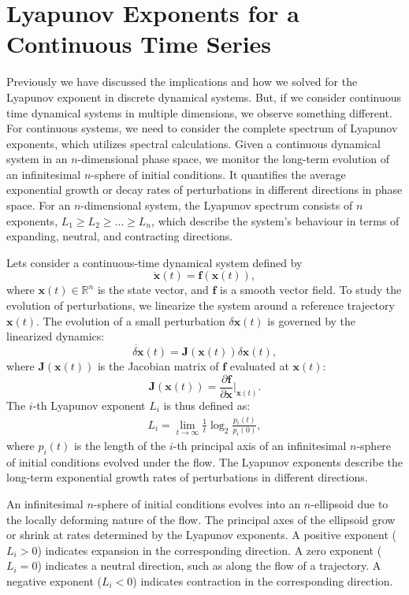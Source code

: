 \section{Lyapunov Exponents for a Continuous Time Series}

Previously we have discussed the implications and how we solved for the Lyapunov exponent in discrete dynamical systems. 
But, if we consider continuous time dynamical systems in multiple dimensions, we observe something different. 
For continuous systems, we need to consider the complete spectrum of Lyapunov exponents, which utilizes spectral calculations. 
Given a continuous dynamical system in an $n$-dimensional phase space, we monitor the long-term evolution of an infinitesimal $n$-sphere of initial conditions. 
It quantifies the average exponential growth or decay rates of perturbations in different directions in phase space. 
For an $n$-dimensional system, the Lyapunov spectrum consists of $n$ exponents, $L_1 \geq L_2 \geq \dots \geq L_n$, which describe the system's behaviour in terms of expanding, neutral, and contracting directions.

Lets consider a continuous-time dynamical system defined by
$$
\dot{\mathbf{x}}(t) = \mathbf{f}(\mathbf{x}(t)),
$$
where $\mathbf{x}(t) \in \mathbb{R}^n$ is the state vector, and $\mathbf{f}$ is a smooth vector field. To study the evolution of perturbations, we linearize the system around a reference trajectory $\mathbf{x}(t)$. The evolution of a small perturbation $\delta\mathbf{x}(t)$ is governed by the linearized dynamics:
$$
\dot{\delta\mathbf{x}}(t) = \mathbf{J}(\mathbf{x}(t)) \delta\mathbf{x}(t),
$$
where $\mathbf{J}(\mathbf{x}(t))$ is the Jacobian matrix of $\mathbf{f}$ evaluated at $\mathbf{x}(t)$:
$$
\mathbf{J}(\mathbf{x}(t)) = \frac{\partial \mathbf{f}}{\partial \mathbf{x}} \bigg|_{\mathbf{x}(t)}.
$$
The $i$-th Lyapunov exponent $L_i$ is thus defined as:
\begin{align}
    L_i = \lim_{t \to \infty} \frac{1}{t} \log_2 \frac{p_i(t)}{p_i(0)}, \label{eq:continuous}
\end{align}
where $p_i(t)$ is the length of the $i$-th principal axis of an infinitesimal $n$-sphere of initial conditions evolved under the flow. The Lyapunov exponents describe the long-term exponential growth rates of perturbations in different directions.

An infinitesimal $n$-sphere of initial conditions evolves into an $n$-ellipsoid due to the locally deforming nature of the flow. The principal axes of the ellipsoid grow or shrink at rates determined by the Lyapunov exponents. A positive exponent ($L_i > 0$) indicates expansion in the corresponding direction. A zero exponent ($L_i = 0$) indicates a neutral direction, such as along the flow of a trajectory. A negative exponent ($L_i < 0$) indicates contraction in the corresponding direction.

